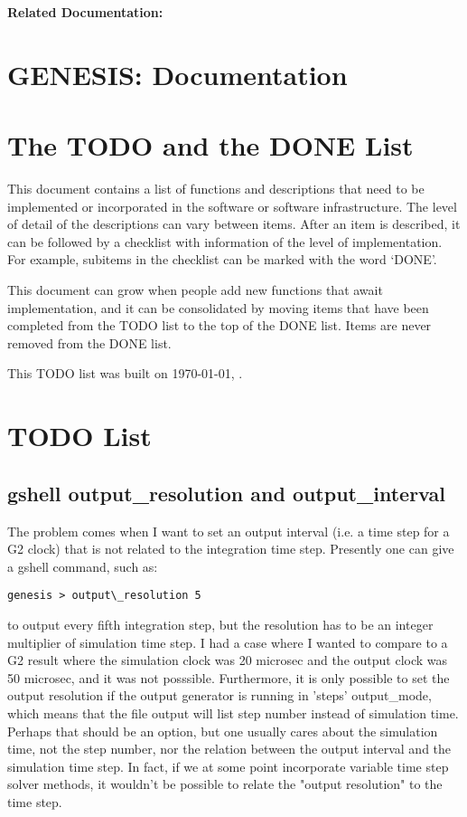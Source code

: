 \documentclass[12pt]{article}
\begin{document}
{\bf Related Documentation:}

\section*{GENESIS: Documentation}

\section{The TODO and the DONE List}

This document contains a list of functions and descriptions that need
to be implemented or incorporated in the software or software
infrastructure.  The level of detail of the descriptions can vary
between items.  After an item is described, it can be followed by a
checklist with information of the level of implementation.  For
example, subitems in the checklist can be marked with the word `DONE'.

This document can grow when people add new functions that await
implementation, and it can be consolidated by moving items that have
been completed from the TODO list to the top of the DONE list.  Items
are never removed from the DONE list.

This TODO list was built on \today, \thistime.


\section{TODO List}

\subsection{gshell output\_resolution and output\_interval}

The problem comes when I want to set an output interval (i.e. a time
step for a G2 clock) that is not related to the integration time step.
Presently one can give a gshell command, such as:

\begin{verbatim}
genesis > output\_resolution 5
\end{verbatim}

to output every fifth integration step, but the resolution has to be
an integer multiplier of simulation time step. I had a case where I
wanted to compare to a G2 result where the simulation clock was 20
microsec and the output clock was 50 microsec, and it was not
posssible.  Furthermore, it is only possible to set the output
resolution if the output generator is running in 'steps' output\_mode,
which means that the file output will list step number instead of
simulation time.  Perhaps that should be an option, but one usually
cares about the simulation time, not the step number, nor the relation
between the output interval and the simulation time step. In fact, if
we at some point incorporate variable time step solver methods, it
wouldn't be possible to relate the "output resolution" to the time
step.
\end{document}
